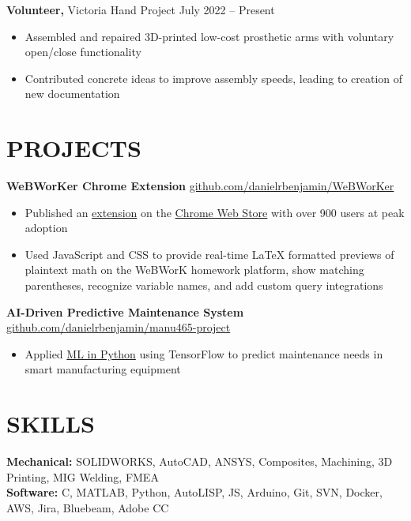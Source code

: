 \documentclass[11pt]{article}       %
\newcommand{\utmSource}{website}
\newcommand{\utmMedium}{resume}
\newcommand{\utmCampaign}{evergreen}
\newcommand{\utmContent}{general_resume}
\newcommand{\trackedPortfolioURL}[1]{%
  https://www.danielrbenjamin.com/#1?utm_source=\utmSource\&utm_medium=\utmMedium\&utm_campaign=\utmCampaign\&utm_content=\utmContent%
}
\newcommand{\portfolioLink}[2]{%
  \href{\trackedPortfolioURL{#1}}{#2}%
}
\begin{document}
\vspace{3pt}

\textbf{Volunteer,} {Victoria Hand Project} \hfill July 2022 -- Present \\
\vspace{-8.5pt}
\begin{itemize}
  \item Assembled and repaired 3D-printed low-cost prosthetic arms with voluntary open/close functionality
  \item Contributed concrete ideas to improve assembly speeds, leading to creation of new documentation
\end{itemize}

\section*{PROJECTS}
\textbf{WeBWorKer Chrome Extension} \hfill \href{https://github.com/danielrbenjamin/WeBWorKer}{github.com/danielrbenjamin/WeBWorKer} \\
\vspace{-8.5pt}
\begin{itemize}
  \item Published an \portfolioLink{projects/webworker/}{extension} on the \href{https://chromewebstore.google.com/detail/webworker/cokogomdladilchdakkknehhnnoipbke}{Chrome Web Store} with over 900 users at peak adoption
  \item Used JavaScript and CSS to provide real-time LaTeX formatted previews of plaintext math on the WeBWorK homework platform, show matching parentheses, recognize variable names, and add custom query integrations
\end{itemize}

\vspace{3pt}

\textbf{AI-Driven Predictive Maintenance System} \hfill \href{https://github.com/danielrbenjamin/manu465-project}{github.com/danielrbenjamin/manu465-project} \\
\vspace{-8.5pt}
\begin{itemize}
  \item Applied \portfolioLink{projects/manu465-project/}{ML in Python} using TensorFlow to predict maintenance needs in smart manufacturing equipment
\end{itemize}

\section*{SKILLS}
\textbf{Mechanical:} SOLIDWORKS, AutoCAD, ANSYS, Composites, Machining, 3D Printing, MIG Welding, FMEA\\
\textbf{Software:} C, MATLAB, Python, AutoLISP, JS, Arduino, Git, SVN, Docker, AWS, Jira, Bluebeam, Adobe CC
\end{document}
